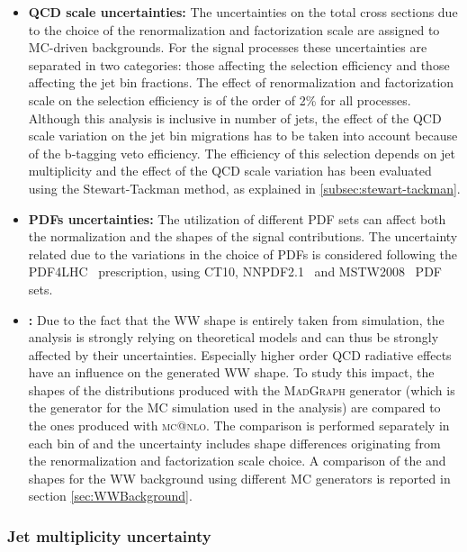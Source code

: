 \begin{itemize}

\item {\bf QCD scale uncertainties:}
  The uncertainties on the total cross sections due to the choice of the renormalization and factorization scale are assigned to MC-driven backgrounds.
  For the signal processes these uncertainties are separated in two categories: those affecting the selection efficiency and those affecting the jet bin fractions.
  The effect of renormalization and factorization scale on the selection efficiency is of the order of 2\% for all processes.
  Although this analysis is inclusive in number of jets, the effect of the QCD scale variation on the jet bin migrations has to be taken into account because of the b-tagging veto efficiency. The efficiency of this selection depends on jet multiplicity and the effect of the QCD scale variation has been evaluated using the Stewart-Tackman method, as explained in \ref{subsec:stewart-tackman}.

\item {\bf PDFs uncertainties:} 
  The utilization of different PDF sets can affect both the normalization and the shapes of the signal contributions. The uncertainty related due to the variations in the choice of PDFs is considered following the PDF4LHC~\cite{Alekhin:2011sk,Botje:2011sn} prescription, using CT10, NNPDF2.1~\cite{Ball:2011mu} and MSTW2008~\cite{Martin:2009iq} PDF sets.


\item {\bf {}:} 
  Due to the fact that the WW shape is entirely taken from simulation, the analysis is strongly
  relying on theoretical models and can thus be strongly affected by their uncertainties. Especially higher order QCD radiative effects have an influence on the generated WW shape. To study this impact, the shapes of the distributions produced with the \textsc{MadGraph} generator (which is the generator for the MC simulation used in the analysis) are compared to the ones produced with \textsc{mc@nlo}. The comparison is performed separately in each bin of \pth and the uncertainty includes shape differences originating from the renormalization and factorization scale choice. A comparison of the \mll and \mt shapes for the WW background using different MC generators is reported in section \ref{sec:WWBackground}.
\end{itemize} 

\subsubsection{Jet multiplicity uncertainty \label{subsec:stewart-tackman}}

